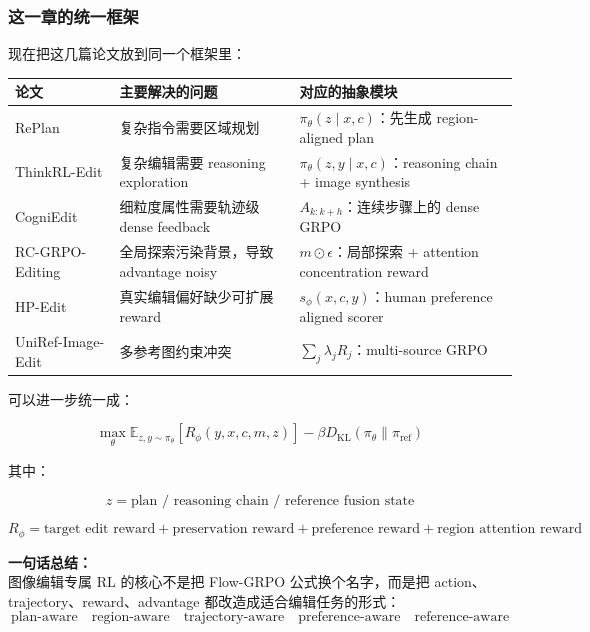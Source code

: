\subsubsection{这一章的统一框架}

现在把这几篇论文放到同一个框架里：

\begin{center}
{\small
\begin{tabular}{p{3.2cm}p{4.2cm}p{5.4cm}}
\hline
\textbf{论文} & \textbf{主要解决的问题} & \textbf{对应的抽象模块} \\
\hline
RePlan
&
复杂指令需要区域规划
&
$\pi_\theta(z\mid x,c)$：先生成 region-aligned plan
\\
ThinkRL-Edit
&
复杂编辑需要 reasoning exploration
&
$\pi_\theta(z,y\mid x,c)$：reasoning chain + image synthesis
\\
CogniEdit
&
细粒度属性需要轨迹级 dense feedback
&
$A_{k:k+h}$：连续步骤上的 dense GRPO
\\
RC-GRPO-Editing
&
全局探索污染背景，导致 advantage noisy
&
$m\odot\epsilon$：局部探索 + attention concentration reward
\\
HP-Edit
&
真实编辑偏好缺少可扩展 reward
&
$s_\phi(x,c,y)$：human preference aligned scorer
\\
UniRef-Image-Edit
&
多参考图约束冲突
&
$\sum_j \lambda_j R_j$：multi-source GRPO
\\
\hline
\end{tabular}
}
\end{center}

可以进一步统一成：

\[
\max_\theta
\mathbb{E}_{z,y\sim\pi_\theta}
\left[
R_\phi(y,x,c,m,z)
\right]
-
\beta
D_\text{KL}
\left(
\pi_\theta
\|
\pi_\text{ref}
\right)
\]

其中：

\[
z
=
\text{plan / reasoning chain / reference fusion state}
\]

\[
R_\phi
=
\text{target edit reward}
+
\text{preservation reward}
+
\text{preference reward}
+
\text{region attention reward}
\]

\begin{summarybox}
\textbf{一句话总结：}\\
图像编辑专属 RL 的核心不是把 Flow-GRPO 公式换个名字，而是把 action、trajectory、reward、advantage 都改造成适合编辑任务的形式：
\[
\text{plan-aware}
\quad
\text{region-aware}
\quad
\text{trajectory-aware}
\quad
\text{preference-aware}
\quad
\text{reference-aware}
\]
\end{summarybox}

